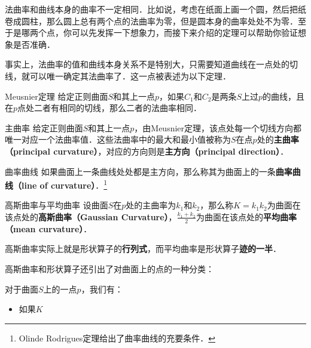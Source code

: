 法曲率和曲线本身的曲率不一定相同．比如说，考虑在纸面上画一个圆，然后把纸卷成圆柱，那么圆上总有两个点的法曲率为零，但是圆本身的曲率处处不为零．至于是哪两个点，你可以先发挥一下想象力，而接下来介绍的定理可以帮助你验证想象是否准确．

事实上，法曲率的值和曲线本身关系不是特别大，只需要知道曲线在一点处的切线，就可以唯一确定其法曲率了．这一点被表述为以下定理．

\begin{theorem}{Meusnier定理}
给定正则曲面$S$和其上一点$p$，如果$C_1$和$C_2$是两条$S$上过$p$的曲线，且在$p$点处二者有相同的切线，那么二者的法曲率相同．
\end{theorem}

\begin{definition}{主曲率}
给定正则曲面$S$和其上一点$p$，由Meusnier定理，该点处每一个切线方向都唯一对应一个法曲率值．这些法曲率中的最大和最小值被称为$S$在点$p$处的\textbf{主曲率（principal curvature）}，对应的方向则是\textbf{主方向（principal direction）}．
\end{definition}

\begin{definition}{曲率曲线}
如果曲面上一条曲线处处都是主方向，那么称其为曲面上的一条\textbf{曲率曲线（line of curvature）}．\footnote{Olinde Rodrigues定理给出了曲率曲线的充要条件．}
\end{definition}

\begin{definition}{高斯曲率与平均曲率}
设曲面$S$在$p$处的主曲率为$k_1$和$k_2$，那么称$K=k_1k_2$为曲面在该点处的\textbf{高斯曲率（Gaussian Curvature）}，$\frac{k_1+k_2}{2}$为曲面在该点处的\textbf{平均曲率（mean curvature）}．
\end{definition}

高斯曲率实际上就是形状算子的\textbf{行列式}，而平均曲率是形状算子\textbf{迹的一半}．

高斯曲率和形状算子还引出了对曲面上的点的一种分类：

\begin{definition}{}
对于曲面$S$上的一点$p$，我们有：
\begin{itemize}
\item 如果$K$
\end{itemize}
\end{definition}
